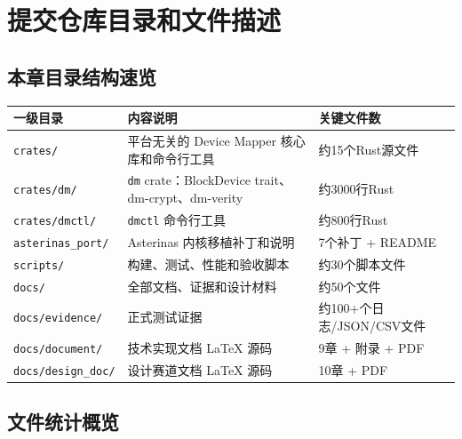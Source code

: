 \chapter{提交仓库目录和文件描述}

\section*{本章目录结构速览}

\begin{table}[H]
    \centering
    \begin{tabular}{p{}p{}p{}}
        \toprule
        \textbf{一级目录} & \textbf{内容说明} & \textbf{关键文件数} \\
        \midrule
        \texttt{crates/} & 平台无关的 Device Mapper 核心库和命令行工具 & 约15个Rust源文件 \\
        \texttt{crates/dm/} & \texttt{dm} crate：BlockDevice trait、dm-crypt、dm-verity & 约3000行Rust \\
        \texttt{crates/dmctl/} & \texttt{dmctl} 命令行工具 & 约800行Rust \\
        \texttt{asterinas\_port/} & Asterinas 内核移植补丁和说明 & 7个补丁 + README \\
        \texttt{scripts/} & 构建、测试、性能和验收脚本 & 约30个脚本文件 \\
        \texttt{docs/} & 全部文档、证据和设计材料 & 约50个文件 \\
        \texttt{docs/evidence/} & 正式测试证据 & 约100+个日志/JSON/CSV文件 \\
        \texttt{docs/document/} & 技术实现文档 LaTeX 源码 & 9章 + 附录 + PDF \\
        \texttt{docs/design\_doc/} & 设计赛道文档 LaTeX 源码 & 10章 + PDF \\
        \bottomrule
    \end{tabular}
\end{table}

\section{文件统计概览}

